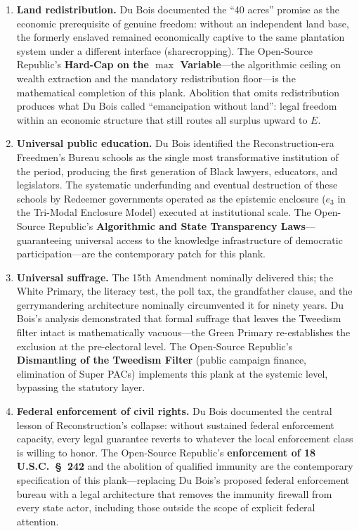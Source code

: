 \begin{enumerate}
    \item \textbf{Land redistribution.} Du Bois documented the ``40 acres'' promise as the economic prerequisite of genuine freedom: without an independent land base, the formerly enslaved remained economically captive to the same plantation system under a different interface (sharecropping). The Open-Source Republic's \textbf{Hard-Cap on the $\max$ Variable}---the algorithmic ceiling on wealth extraction and the mandatory redistribution floor---is the mathematical completion of this plank. Abolition that omits redistribution produces what Du Bois called ``emancipation without land'': legal freedom within an economic structure that still routes all surplus upward to $E$.

    \item \textbf{Universal public education.} Du Bois identified the Reconstruction-era Freedmen's Bureau schools as the single most transformative institution of the period, producing the first generation of Black lawyers, educators, and legislators. The systematic underfunding and eventual destruction of these schools by Redeemer governments operated as the epistemic enclosure ($e_3$ in the Tri-Modal Enclosure Model) executed at institutional scale. The Open-Source Republic's \textbf{Algorithmic and State Transparency Laws}---guaranteeing universal access to the knowledge infrastructure of democratic participation---are the contemporary patch for this plank.

    \item \textbf{Universal suffrage.} The 15th Amendment nominally delivered this; the White Primary, the literacy test, the poll tax, the grandfather clause, and the gerrymandering architecture nominally circumvented it for ninety years. Du Bois's analysis demonstrated that formal suffrage that leaves the Tweedism filter intact is mathematically vacuous---the Green Primary re-establishes the exclusion at the pre-electoral level. The Open-Source Republic's \textbf{Dismantling of the Tweedism Filter} (public campaign finance, elimination of Super PACs) implements this plank at the systemic level, bypassing the statutory layer.

    \item \textbf{Federal enforcement of civil rights.} Du Bois documented the central lesson of Reconstruction's collapse: without sustained federal enforcement capacity, every legal guarantee reverts to whatever the local enforcement class is willing to honor. The Open-Source Republic's \textbf{enforcement of 18 U.S.C.~\S~242} and the abolition of qualified immunity are the contemporary specification of this plank---replacing Du Bois's proposed federal enforcement bureau with a legal architecture that removes the immunity firewall from every state actor, including those outside the scope of explicit federal attention.
\end{enumerate}


